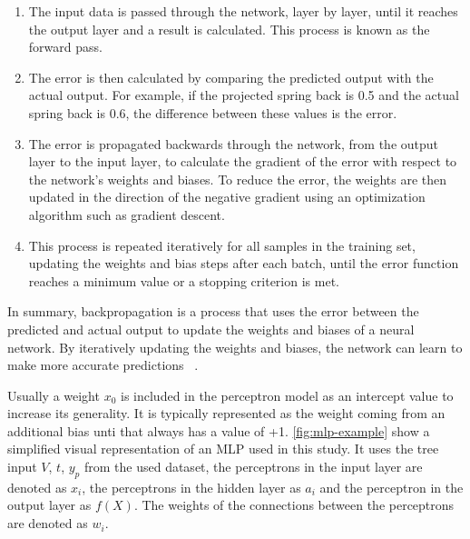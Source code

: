 \begin{enumerate}
    \item The input data is passed through the network, layer by layer, until it reaches the output layer and a
    result is calculated.
    This process is known as the forward pass.
    \item The error is then calculated by comparing the predicted output with the actual output.
    For example, if the projected spring back is 0.5 and the actual spring back is 0.6, the difference between these
    values is the error.
    \item The error is propagated backwards through the network, from the output layer to the input layer, to
    calculate the gradient of the error with respect to the network's weights and biases. To reduce the error,
    the weights are then updated in the direction of the negative gradient using an optimization algorithm such
    as gradient descent.
    \item This process is repeated iteratively for all
    samples in the training set, updating the weights and bias steps after each batch, until the error function
    reaches a minimum value or a stopping criterion is met.
\end{enumerate}

In summary, backpropagation is a process that uses the error between the predicted and actual output to update the
weights and biases of a neural network.
By iteratively updating the weights and biases, the network can learn to make more accurate predictions
~\cite[p. 53--57]{nielsen_neuralnetworksdeep_2015}.

Usually a weight $x_0$ is included in the perceptron model as an intercept value to increase its generality.
It is typically represented as the weight coming from an additional bias unti that always has a value of +1.
\cref{fig:mlp-example} show a simplified visual representation of an MLP used in this study.
It uses the tree input $V$, $t$, $y_p$ from the used dataset, the perceptrons in the input layer are denoted as $x_i$,
the perceptrons in the hidden layer as $a_i$ and the perceptron in the output layer as $f(X)$.
The weights of the connections between the perceptrons are denoted as $w_i$.

